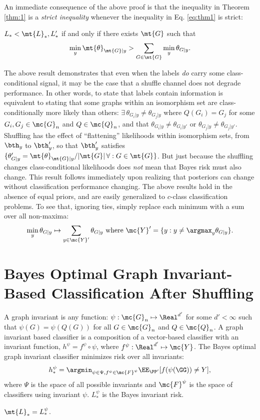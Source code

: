 \documentclass[10pt,journal,cspaper,compsoc]{IEEEtran}
\newcommand{\Qs}{Q}
\begin{document}
An immediate consequence of the above proof is that the inequality in Theorem \ref{thm:1} is a \emph{strict inequality} whenever the inequality in Eq. \ref{eq:thm1} is strict:

\begin{thm}
	$L_* < \mt{L}_*,L'_*$ if and only if there exists $\mt{G}$ such that
	$$\min_y \mt{\theta}_{\mt{G}|y} > \sum_{G \in \mt{G}}\min_y \theta_{G|y}.$$
\end{thm}
The above result demonstrates that even when the labels \emph{do} carry some class-conditional signal, it may be the case that a shuffle channel does not degrade performance.  In other words, to state that labels contain information is equivalent to stating that some graphs within an isomorphism set are class-conditionally more likely than others: $\exists \, \theta_{G_i|y} \neq \theta_{G_j|y}$ where $\Qs(G_i)=G_j$ for some $G_i,G_j \in \mc{G}_n$ and $\Qs \in \mc{Q}_n$, and that $\theta_{G_i|y}\neq \theta_{G_i|y'}$ or $\theta_{G_j|y}\neq \theta_{G_j|y'}$.  Shuffling has the effect of ``flattening'' likelihoods within isomorphism sets, from $\bth_y$ to $\bth_y'$, so that $\bth_y'$ satisfies $\{\theta_{G|y}'=\mt{\theta}_{\mt{G}|y}/|\mt{G}| \, \forall : G \in \mt{G}\}$.  But just because the shuffling changes class-conditional likelihoods does \emph{not} mean that Bayes risk must also change. This result follows immediately upon realizing that posteriors can change without classification performance changing.  The above results hold in the absence of equal priors, and are easily generalized to  $c$-class classification problems.  To see that, ignoring ties, simply replace each minimum with a sum over all non-maxima: 
$$\min_y \theta_{G|y} \mapsto \sum_{y \in \mc{Y}'} \theta_{G|y} \text{ where } \mc{Y}' =\{y : y \neq \argmax_y \theta_{G|y}\}.$$



\section{Bayes Optimal Graph Invariant-Based Classification After Shuffling} %
\label{sec:gi}

A graph invariant is any function: $\psi: \mc{G}_n \mapsto \Real^{d'}$  for some $d' < \infty$ such that $\psi(G)=\psi(\Qs(G))$ for all $G \in \mc{G}_n$ and $\Qs \in \mc{Q}_n$.  A graph invariant based classifier is a composition of a vector-based classifier with an invariant function, $h^\psi=f^\psi \circ \psi$, where $f^\psi: \Real^{d'} \mapsto \mc{Y}$.  The Bayes optimal graph invariant classifier minimizes risk over all invariants: 
\begin{align}
	h_*^{\psi}=\argmin_{\psi \in \Psi, f^{\psi} \in \mc{F}^{\psi}} \EE_{\PP'}[f(\psi(\GG))\neq Y],
\end{align}
where $\Psi$ is the space of all possible invariants and $\mc{F}^{\psi}$ is the space of classifiers using invariant $\psi$.   $L_*^{\psi}$ is the Bayes invariant risk.  
\begin{thm}
	$\mt{L}_*=L_*^\psi$.
\end{thm}
\end{document}
